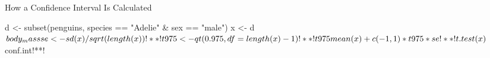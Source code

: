 \begin{frame}[fragile]{How a Confidence Interval Is Calculated}
\begin{minipage}{.88\textwidth}
\footnotesize
\begin{rsession}
d <- subset(penguins, species == "Adelie" & sex == "male")
x <- d$body_mass
se <- sd(x) / sqrt(length(x))!*\CodeMark{se}*!
t975 <- qt(0.975, df = length(x) - 1)!*\CodeMark{qt}*!
t975
mean(x) + c(-1, 1) * t975 * se!*\CodeMark{ci}*!
t.test(x)$conf.int!**!
\end{rsession}
\end{minipage}
\end{frame}

